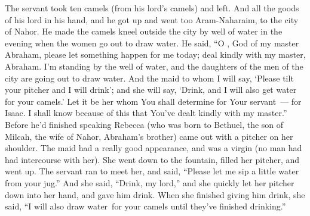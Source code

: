\begin{inparaenum}
   The servant took ten camels (from his lord's camels) and left. And all the goods of his lord in his hand, and he got up and went too Aram-Naharaim, to the city of Nahor.%
   He made the camels kneel outside the city by well of water in the evening when the women go out to draw water.%
   He said, ``O \lord, God of my master Abraham, please let something happen for me today; deal kindly with my master, Abraham.%
   I'm standing by the well of water, and the daughters of the men of the city are going out to draw water.%
   And the maid to whom I will say, `Please tilt your pitcher and I will drink'; and she will say, `Drink, and I will also get water for your camels.' Let it be her whom You shall determine for Your servant~--- for Isaac. I shall know because of this that You've dealt kindly with my master.''%
   Before he'd finished speaking Rebecca (who was born to Bethuel, the son of Milcah, the wife of Nahor, Abraham's brother) came out with a pitcher on her shoulder.%
   The maid had a really good appearance, and was a virgin (no man had had intercourse with her). She went down to the fountain, filled her pitcher, and went up.%
   The servant ran to meet her, and said, ``Please let me sip a little water from your jug.''%
   And she said, ``Drink, my lord,'' and she quickly let her pitcher down into her hand, and gave him drink.%
   When she finished giving him drink, she said, ``I will also draw water\understood{}\ for your camels until they've finished drinking.''%

\end{inparaenum}

